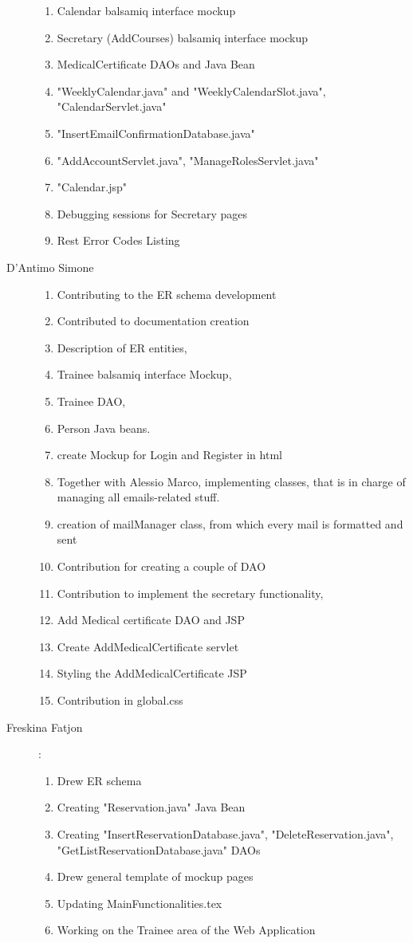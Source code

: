 \begin{description}
\begin{flushleft}
\begin{enumerate}
			\item Calendar balsamiq interface mockup
			\item Secretary (AddCourses) balsamiq interface mockup
			\item MedicalCertificate DAOs and Java Bean
			\item "WeeklyCalendar.java" and "WeeklyCalendarSlot.java", "CalendarServlet.java"
			\item "InsertEmailConfirmationDatabase.java"
			\item "AddAccountServlet.java", "ManageRolesServlet.java"
			\item "Calendar.jsp"
			\item Debugging sessions for Secretary pages		 		
			\item Rest Error Codes Listing
		\end{enumerate}
	\end{flushleft}
	\item[D'Antimo Simone] 
	\begin{enumerate}
		\item Contributing to the ER schema development
		\item Contributed to documentation creation
		\item Description of ER entities,
		\item Trainee balsamiq interface Mockup,
		\item Trainee DAO,
		\item Person Java beans.
		\item create Mockup for Login and Register in html
		\item Together with Alessio Marco, implementing classes, that is in charge of managing all emails-related stuff.
		\item creation of mailManager class, from which every mail is formatted and sent
	    \item Contribution for creating a couple of DAO
	    \item Contribution to implement the secretary functionality,
		\item Add Medical certificate DAO and JSP 
		\item Create AddMedicalCertificate servlet
		\item Styling the AddMedicalCertificate JSP
		\item Contribution in global.css 
	\end{enumerate}
	\item[Freskina Fatjon] :
	\begin{enumerate}
		\item Drew ER schema 
		\item Creating "Reservation.java" Java Bean 
		\item Creating "InsertReservationDatabase.java", "DeleteReservation.java", "GetListReservationDatabase.java" DAOs
		\item Drew general template of mockup pages 
		\item Updating MainFunctionalities.tex
		\item Working on the Trainee area of the Web Application
	\end{enumerate} 
	

\end{description}
